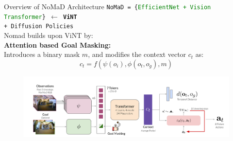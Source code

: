 \documentclass{beamer}
\begin{document}
\begin{frame}{Overview of NoMaD Architecture}
    \texttt{NoMaD = \{\textcolor{green}{EfficientNet + Vision Transformer}\} $\leftarrow$ \textbf{ViNT} \\+ Diffusion Policies}\\
    Nomad builds upon ViNT by:\\
    \textbf{Attention based Goal Masking:}\\
    Introduces a binary mask $m$, and modifies the context vector $c_t$ as:
    \[c_t = f(\psi(o_i),\phi(o_t,o_g),m)\]
    \begin{figure}
        \centering
        \includegraphics[width=1.01\linewidth]{nomad_diagram.png}
    \end{figure}
\end{frame}
\end{document}
